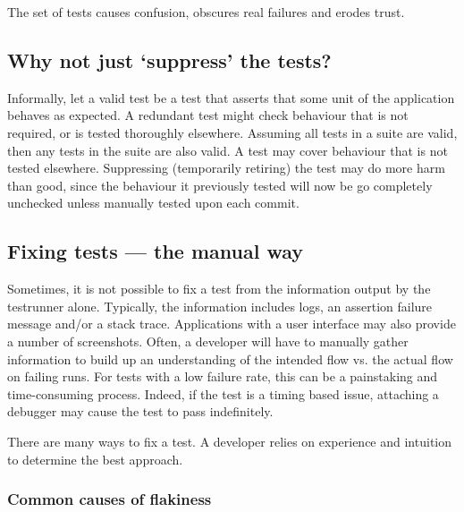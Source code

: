 The set of \flaky tests causes confusion, obscures real failures and erodes
trust.


\subsection{Why not just {\lq}suppress{\rq} the \flaky tests?}

Informally, let a valid test be a test that asserts that some unit of the
application behaves as expected. A redundant test might check behaviour that is
not required, or is tested thoroughly elsewhere. Assuming all tests in a suite
are valid, then any \flaky tests in the suite are also valid. A \flaky test may
cover behaviour that is not tested elsewhere. Suppressing (temporarily retiring)
the \flaky test may do more harm than good, since the behaviour it previously
tested will now be go completely unchecked unless manually tested upon each
commit.


\subsection{Fixing \flaky tests --- the manual way}

Sometimes, it is not possible to fix a \flaky test from the information output
by the testrunner alone. Typically, the information includes logs, an assertion
failure message and/or a stack trace. Applications with a user interface may
also provide a number of screenshots. Often, a developer will have to manually
gather information to build up an understanding of the intended flow vs. the
actual flow on failing runs. For \flaky tests with a low failure rate, this can
be a painstaking and time-consuming process. Indeed, if the \flaky test is a
timing based issue, attaching a debugger may cause the test to pass
indefinitely.

There are many ways to fix a \flaky test. A developer relies on experience and
intuition to determine the best approach.

\subsubsection{Common causes of flakiness}

